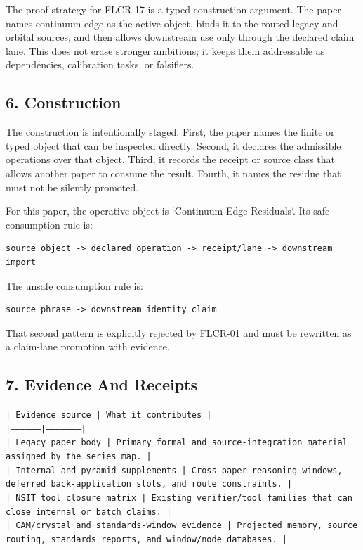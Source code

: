 \documentclass[11pt]{article}
\begin{document}
The proof strategy for FLCR-17 is a typed construction argument. The paper names continuum edge as the active object, binds it to the routed legacy and orbital sources, and then allows downstream use only through the declared claim lane. This does not erase stronger ambitions; it keeps them addressable as dependencies, calibration tasks, or falsifiers.

\subsection*{6. Construction}

The construction is intentionally staged. First, the paper names the finite or
typed object that can be inspected directly. Second, it declares the admissible
operations over that object. Third, it records the receipt or source class that
allows another paper to consume the result. Fourth, it names the residue that
must not be silently promoted.

For this paper, the operative object is `Continuum Edge Residuals`. Its safe consumption
rule is:

\begin{verbatim}
source object -> declared operation -> receipt/lane -> downstream import
\end{verbatim}

The unsafe consumption rule is:

\begin{verbatim}
source phrase -> downstream identity claim
\end{verbatim}

That second pattern is explicitly rejected by FLCR-01 and must be rewritten as
a claim-lane promotion with evidence.

\subsection*{7. Evidence And Receipts}

\noindent\texttt{| Evidence source | What it contributes |}\\
\noindent\texttt{|-----------------|---------------------|}\\
\noindent\texttt{| Legacy paper body | Primary formal and source-integration material assigned by the series map. |}\\
\noindent\texttt{| Internal and pyramid supplements | Cross-paper reasoning windows, deferred back-application slots, and route constraints. |}\\
\noindent\texttt{| NSIT tool closure matrix | Existing verifier/tool families that can close internal or batch claims. |}\\
\noindent\texttt{| CAM/crystal and standards-window evidence | Projected memory, source routing, standards reports, and window/node databases. |}\\
\end{document}
